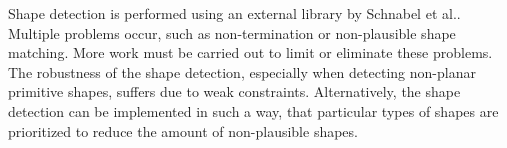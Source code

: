 Shape detection is performed using an external library by Schnabel et al.\cite{schnabel-2007-software}. Multiple problems occur, such as non-termination or non-plausible shape matching. More work must be carried out to limit or eliminate these problems. The robustness of the shape detection, especially when detecting non-planar primitive shapes, suffers due to weak constraints. Alternatively, the shape detection can be implemented in such a way, that particular types of shapes are prioritized to reduce the amount of non-plausible shapes. 
\\

